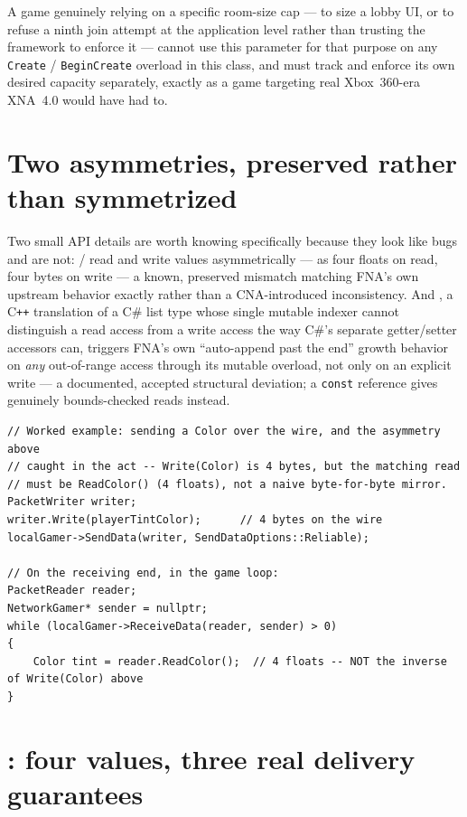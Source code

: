 A game genuinely relying on a specific room-size cap --- to size a lobby UI, or to refuse a
ninth join attempt at the application level rather than trusting the framework to enforce it ---
cannot use this parameter for that purpose on any \texttt{Create} / \texttt{BeginCreate} overload
in this class, and must track and enforce its own desired capacity separately, exactly as a game
targeting real Xbox~360-era XNA~4.0 would have had to.

\section{Two asymmetries, preserved rather than symmetrized}

Two small API details are worth knowing specifically because they look like bugs and are
not:  /  read and write  values
asymmetrically --- as four floats on read, four bytes on write --- a known, preserved mismatch
matching FNA's own upstream behavior exactly rather than a CNA-introduced inconsistency. And
, a C\texttt{++} translation of a C\# list type whose
single mutable indexer cannot distinguish a read access from a write access the way C\#'s
separate getter/setter accessors can, triggers FNA's own ``auto-append past the end'' growth
behavior on \emph{any} out-of-range access through its mutable overload, not only on an
explicit write --- a documented, accepted structural deviation; a \texttt{const} reference
gives genuinely bounds-checked reads instead.

\begin{lstlisting}
// Worked example: sending a Color over the wire, and the asymmetry above
// caught in the act -- Write(Color) is 4 bytes, but the matching read
// must be ReadColor() (4 floats), not a naive byte-for-byte mirror.
PacketWriter writer;
writer.Write(playerTintColor);      // 4 bytes on the wire
localGamer->SendData(writer, SendDataOptions::Reliable);

// On the receiving end, in the game loop:
PacketReader reader;
NetworkGamer* sender = nullptr;
while (localGamer->ReceiveData(reader, sender) > 0)
{
    Color tint = reader.ReadColor();  // 4 floats -- NOT the inverse of Write(Color) above
}
\end{lstlisting}

\section{: four values, three real delivery guarantees}

